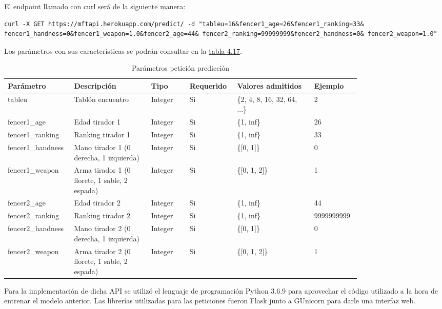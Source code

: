 El endpoint llamado con curl será de la siguiente manera:

\begin{lstlisting}
curl -X GET https://mftapi.herokuapp.com/predict/ -d "tableu=16&fencer1_age=26&fencer1_ranking=33& fencer1_handness=0&fencer1_weapon=1.0&fencer2_age=44& fencer2_ranking=99999999&fencer2_handness=0& fencer2_weapon=1.0"
\end{lstlisting}

Los parámetros con sus características se podrán consultar en la \hyperref[tab:Parmetros peticion prediccion]{tabla 4.17}.

\newpage

\begin{longtable}{p{0.1\linewidth} | p{0.2\linewidth} p{0.1\linewidth} p{0.1\linewidth} p{0.2\linewidth} p{0.1\linewidth}}
	\caption{Parámetros petición predicción}
	\label{tab:Parmetros peticion prediccion}

  \endfirsthead
  \endhead

  Parámetro & Descripción & Tipo & Requerido & Valores admitidos & Ejemplo \\ \hline
  tableu & Tablón encuentro & Integer & Si & \{2, 4, 8, 16, 32, 64, ...\} & 2 \\ \hline
  fencer1\_age & Edad tirador 1 & Integer & Si & \{1, inf\} & 26 \\
  fencer1\_ranking & Ranking tirador 1 & Integer & Si & \{1, inf\} & 33 \\
  fencer1\_handness & Mano tirador 1 (0 derecha, 1 izquierda) & Integer & Si & \{{[}0, 1{]}\} & 0 \\
  fencer1\_weapon & Arma tirador 1 (0 florete, 1 sable, 2 espada) & Integer & Si & \{{[}0, 1, 2{]}\} & 1 \\ \hline
  fencer2\_age & Edad tirador 2 & Integer & Si & \{1, inf\} & 44 \\
  fencer2\_ranking & Ranking tirador 2 & Integer & Si & \{1, inf\} & 9999999999 \\
  fencer2\_handness & Mano tirador 2 (0 derecha, 1 izquierda) & Integer & Si & \{{[}0, 1{]}\} & 0 \\
  fencer2\_weapon & Arma tirador 2 (0 florete, 1 sable, 2 espada) & Integer & Si & \{{[}0, 1, 2{]}\} & 1
\end{longtable}

Para la implementación de dicha API se utilizó el lenguaje de programación Python 3.6.9 para
aprovechar el código utilizado a la hora de entrenar el modelo anterior. Las librerías
utilizadas para las peticiones fueron Flask junto a GUnicorn para darle una interfaz web.


